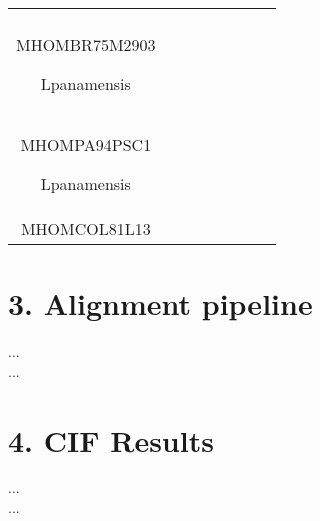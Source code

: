 \documentclass[table,
12pt, %
a4paper, %
oneside, %
headinclude,footinclude, %
BCOR5mm, %
]{scrartcl}
\begin{document}
\begin{table}[hbt]
\begin{adjustbox}{width=\columnwidth,center}
\begin{tabular}{|c|c|c|c|c|c|c|c|}
{\begin{enumerate}
          \item Lbraziliensis\\MHOMBR75M2903
          \item Lpanamensis\\MHOMPA94PSC1
          \item Lpanamensis\\MHOMCOL81L13
        \end{enumerate}} \\
      \bottomrule
    \end{tabular}
    \label{table:Genomeclusters1}
  \end{adjustbox}
\end{table}

\newpage

\section{3. Alignment pipeline}
...\\
...

\section{4. CIF Results}

...\\
...


\newpage
\
\renewcommand{\refname}{\spacedlowsmallcaps{References}} %




\end{document}
